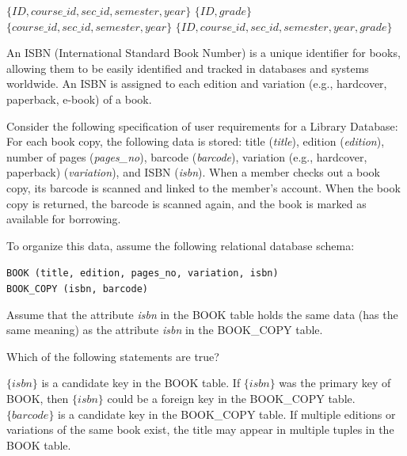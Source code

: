 \documentclass[12pt]{exam}
\begin{document}
\begin{questions}
\begin{minipage}{\linewidth}
\begin{checkboxes}
\choice $\{\textit{ID}, \textit{course\_id}, \textit{sec\_id}, \textit{semester}, \textit{year}\}$
\CorrectChoice $\{\textit{ID}, \textit{grade}\}$
\CorrectChoice $\{\textit{course\_id}, \textit{sec\_id}, \textit{semester}, \textit{year}\}$
\choice $\{\textit{ID}, \textit{course\_id}, \textit{sec\_id}, \textit{semester}, \textit{year}, \textit{grade}\}$
\end{checkboxes}
\end{minipage}\vspace{1em}


\begin{minipage}{\linewidth}
\question[4]
An ISBN (International Standard Book Number) is a unique identifier for books, allowing them to be easily identified and tracked in databases and systems worldwide. An ISBN is assigned to each edition and variation (e.g., hardcover, paperback, e-book) of a book.

Consider the following specification of user requirements for a Library Database: For each book copy, the following data is stored: title (\textit{title}), edition (\textit{edition}), number of pages (\textit{pages\_no}), barcode (\textit{barcode}), variation (e.g., hardcover, paperback) (\textit{variation}), and ISBN (\textit{isbn}). When a member checks out a book copy, its barcode is scanned and linked to the member’s account. When the book copy is returned, the barcode is scanned again, and the book is marked as available for borrowing.

To organize this data, assume the following relational database schema:

\begin{center}
\texttt{BOOK (title, edition, pages\_no, variation, isbn)}\\
\texttt{BOOK\_COPY (isbn, barcode)}
\end{center}

Assume that the attribute \textit{isbn} in the BOOK table holds the same data (has the same meaning) as the attribute \textit{isbn} in the BOOK\_COPY table.

Which of the following statements are true?\par\vspace{0.5em}

\begin{checkboxes}
\CorrectChoice $\{\textit{isbn}\}$ is a candidate key in the BOOK table.
\CorrectChoice If $\{\textit{isbn}\}$ was the primary key of BOOK, then $\{\textit{isbn}\}$ could be a foreign key in the BOOK\_COPY table.
\CorrectChoice $\{\textit{barcode}\}$ is a candidate key in the BOOK\_COPY table.
\CorrectChoice If multiple editions or variations of the same book exist, the title may appear in multiple tuples in the BOOK table.
\end{checkboxes}
\end{minipage}\vspace{1em}



\end{questions}
\end{document}
